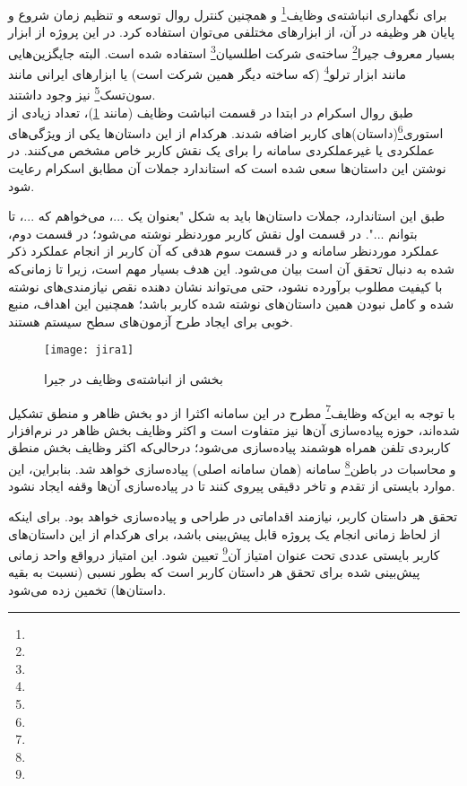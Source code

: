 برای نگهداری انباشته‌ی وظایف\footnote{} و همچنین کنترل روال توسعه و تنظیم زمان شروع و پایان هر وظیفه در آن، از ابزارهای مختلفی می‌توان استفاده کرد. در این پروژه از ابزار بسیار معروف جیرا\footnote{} ساخته‌ی شرکت اطلسیان\footnote{} استفاده شده است. البته جایگزین‌هایی مانند ابزار ترلو\footnote{} (که ساخته دیگر همین شرکت است) یا ابزارهای ایرانی مانند سون‌تسک\footnote{} نیز وجود داشتند.\cite{jira}\\

طبق روال اسکرام در ابتدا در قسمت انباشت وظایف (مانند \cref{fig:jira1})،‌ تعداد زیادی از استوری\footnote{}(داستان)های کاربر اضافه شدند. هرکدام از این داستان‌ها یکی از ویژگی‌های عملکردی یا غیرعملکردی سامانه را برای یک نقش کاربر خاص مشخص می‌کنند. در نوشتن این داستان‌ها سعی شده است که استاندارد جملات آن مطابق اسکرام رعایت شود.

طبق این استاندارد، جملات داستان‌ها باید به شکل "بعنوان یک ...، می‌خواهم که ...، تا بتوانم ...". در قسمت اول نقش کاربر موردنظر نوشته می‌شود؛ در قسمت دوم، عملکرد موردنظر سامانه و در قسمت سوم هدفی که آن کاربر از انجام عملکرد ذکر شده به دنبال تحقق آن است بیان می‌شود. این هدف بسیار مهم است، زیرا تا زمانی‌که با کیفیت مطلوب برآورده نشود، حتی می‌تواند نشان دهنده نقص نیازمندی‌های نوشته شده و کامل نبودن همین داستان‌های نوشته شده کاربر باشد؛ همچنین این اهداف، منبع خوبی برای ایجاد طرح آزمون‌های سطح سیستم هستند.

\begin{figure}[H]
	\centering
	\texttt{[image: jira1]}
	\caption{بخشی از انباشته‌ی وظایف در جیرا}
	\label{fig:jira1}
\end{figure}

با توجه به این‌که وظایف\footnote{} مطرح در این سامانه اکثرا از دو بخش ظاهر و منطق تشکیل شده‌اند، حوزه پیاده‌سازی آن‌ها نیز متفاوت است و اکثر وظایف بخش ظاهر در نرم‌افزار کاربردی تلفن همراه هوشمند پیاده‌سازی می‌شود؛ درحالی‌که اکثر وظایف بخش منطق و محاسبات در باطن\footnote{} سامانه (همان سامانه اصلی) پیاده‌سازی خواهد شد. بنابراین، این موارد بایستی از تقدم و تاخر دقیقی پیروی کنند تا در پیاده‌سازی آن‌ها وقفه ایجاد نشود.

\newpage

تحقق هر داستان کاربر، نیازمند اقداماتی در طراحی و پیاده‌سازی خواهد بود. برای اینکه از لحاظ زمانی انجام یک پروژه قابل پیش‌بینی باشد، برای هرکدام از این داستان‌های کاربر بایستی عددی تحت عنوان امتیاز آن\footnote{} تعیین شود. این امتیاز درواقع واحد زمانی پیش‌بینی شده برای تحقق هر داستان کاربر است که بطور نسبی (نسبت به بقیه داستان‌ها) تخمین زده می‌شود. 

